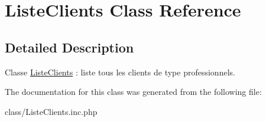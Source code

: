 \hypertarget{class_liste_clients}{
\section{ListeClients Class Reference}
\label{class_liste_clients}
}


\subsection{Detailed Description}
Classe \hyperlink{class_liste_clients}{ListeClients} : liste tous les clients de type professionnels. 

The documentation for this class was generated from the following file:\begin{DoxyCompactItemize}
\item 
class/ListeClients.inc.php\end{DoxyCompactItemize}
